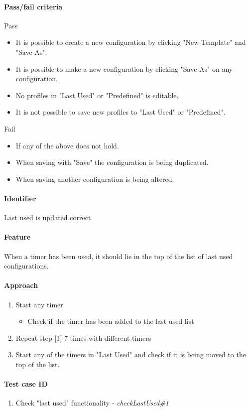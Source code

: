 \paragraph{Pass/fail criteria}
	Pass
	\begin{itemize}
		\item It is possible to create a new configuration by clicking "New Template" and "Save As".
		\item It is possible to make a new configuration by clicking "Save As" on any configuration.
		\item No profiles in "Last Used" or "Predefined" is editable.
		\item It is not possible to save new profiles to "Last Used" or "Predefined".
	\end{itemize}
	Fail
	\begin{itemize}
		\item If any of the above does not hold.
		\item When saving with "Save" the configuration is being duplicated.
		\item When saving another configuration is being altered.
	\end{itemize}


\clearpage
\paragraph{Identifier}
	Last used is updated correct
\paragraph{Feature}
	When a timer has been used, it should lie in the top of the list of last used configurations. 
\paragraph{Approach}
	\begin{enumerate} 
		\item Start any timer
			\begin{itemize}
				\item Check if the timer has been added to the last used list
			\end{itemize}
		\item Repeat step [1] 7 times with different timers
		\item Start any of the timers in "Last Used" and check if it is being moved to the top of the list.
	\end{enumerate}
\paragraph{Test case ID}
	\begin{enumerate}
		\item Check "last used" functionality - \textit{checkLastUsed\#1}
	\end{enumerate}
